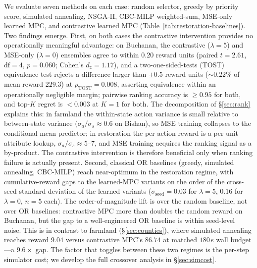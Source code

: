 \documentclass[11pt]{article}
\begin{document}
We evaluate seven methods on each case: random selector, greedy by priority score, simulated annealing, NSGA-II, CBC-MILP weighted-sum, MSE-only learned MPC, and contrastive learned MPC (Table~\ref{tab:restoration-baselines}). Two findings emerge. First, on both cases the contrastive intervention provides no operationally meaningful advantage: on Buchanan, the contrastive ($\lambda{=}5$) and MSE-only ($\lambda{=}0$) ensembles agree to within $0.20$ reward units (paired $t = 2.61$, $\mathrm{df}{=}4$, $p = 0.060$; Cohen's $d_z = 1.17$), and a two-one-sided-tests (TOST) equivalence test rejects a difference larger than $\pm 0.5$ reward units (${\sim}0.22\%$ of mean reward $229.3$) at $p_{\text{TOST}} = 0.008$, asserting equivalence within an operationally negligible margin; pairwise ranking accuracy is $\geq 0.95$ for both, and top-$K$ regret is $< 0.003$ at $K{=}1$ for both. The decomposition of \S\ref{sec:rank} explains this: in farmland the within-state action variance is small relative to between-state variance ($\sigma_a / \sigma_s \approx 0.6$ on Bishan), so MSE training collapses to the conditional-mean predictor; in restoration the per-action reward is a per-unit attribute lookup, $\sigma_a / \sigma_s \approx 5\text{--}7$, and MSE training acquires the ranking signal as a by-product. The contrastive intervention is therefore beneficial only when ranking failure is actually present. Second, classical OR baselines (greedy, simulated annealing, CBC-MILP) reach near-optimum in the restoration regime, with cumulative-reward gaps to the learned-MPC variants on the order of the cross-seed standard deviation of the learned variants ($\sigma_{\text{seed}} = 0.03$ for $\lambda{=}5$, $0.16$ for $\lambda{=}0$, $n=5$ each). The order-of-magnitude lift is over the random baseline, not over OR baselines: contrastive MPC more than doubles the random reward on Buchanan, but the gap to a well-engineered OR baseline is within seed-level noise. This is in contrast to farmland (\S\ref{sec:counties}), where simulated annealing reaches reward $9.04$ versus contrastive MPC's $86.74$ at matched $180$\,s wall budget---a $9.6\times$ gap. The factor that toggles between these two regimes is the per-step simulator cost; we develop the full crossover analysis in \S\ref{sec:simcost}.
\end{document}
